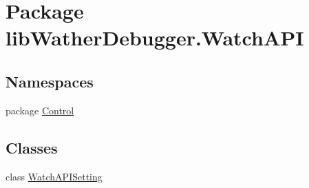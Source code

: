 \hypertarget{namespacelib_wather_debugger_1_1_watch_a_p_i}{\section{Package lib\+Wather\+Debugger.\+Watch\+A\+P\+I}
\label{namespacelib_wather_debugger_1_1_watch_a_p_i}
}
\subsection*{Namespaces}
\begin{DoxyCompactItemize}
\item 
package \hyperlink{namespacelib_wather_debugger_1_1_watch_a_p_i_1_1_control}{Control}
\end{DoxyCompactItemize}
\subsection*{Classes}
\begin{DoxyCompactItemize}
\item 
class \hyperlink{classlib_wather_debugger_1_1_watch_a_p_i_1_1_watch_a_p_i_setting}{Watch\+A\+P\+I\+Setting}
\end{DoxyCompactItemize}
